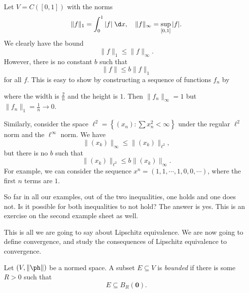 \documentclass[a4paper]{article}
\begin{document}
\begin{eg}
  Let $V = C([0, 1])$ with the norms
  \[
    \|f\|_1 = \int_0^1 |f|\;\d x,\quad \|f\|_\infty = \sup_{[0, 1]}|f|.
  \]
  We clearly have the bound
  \[
    \|f\|_1 \leq \|f\|_\infty.
  \]
  However, there is no constant $b$ such that
  \[
    \|f\| \leq b\|f\|_1
  \]
  for all $f$. This is easy to show by constructing a sequence of functions $f_n$ by
  \begin{center}
  \end{center}
  where the width is $\frac{2}{n}$ and the height is $1$. Then $\|f_n\|_\infty = 1$ but $\|f_n\|_1 = \frac{1}{n} \to 0$.
\end{eg}
\begin{eg}
  Similarly, consider the space $\ell^2 = \left\{(x_n): \sum x_n^2 < \infty\right\}$ under the regular $\ell^2$ norm and the $\ell^\infty$ norm. We have
  \[
    \|(x_k)\|_\infty \leq \|(x_k)\|_{\ell^2},
  \]
  but there is no $b$ such that
  \[
    \|(x_k)\|_{\ell^2} \leq b\|(x_k)\|_\infty.
  \]
  For example, we can consider the sequence $x^n = (1, 1, \cdots, 1, 0, 0, \cdots)$, where the first $n$ terms are $1$.
\end{eg}
So far in all our examples, out of the two inequalities, one holds and one does not. Is it possible for both inequalities to not hold? The answer is yes. This is an exercise on the second example sheet as well.

This is all we are going to say about Lipschitz equivalence. We are now going to define convergence, and study the consequences of Lipschitz equivalence to convergence.
\begin{defi}
  Let $(V, \|\ph \|)$ be a normed space. A subset $E \subseteq V$ is \emph{bounded} if there is some $R > 0$ such that
  \[
    E \subseteq B_R(\mathbf{0}).
  \]
\end{defi}
\end{document}
